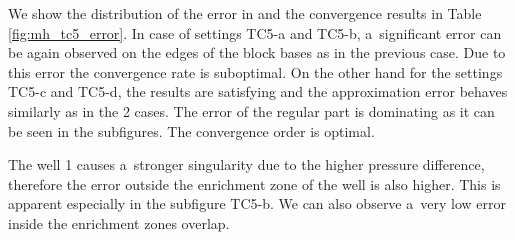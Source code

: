 We show the distribution of the error in  and the convergence results in Table \ref{fig:mh_tc5_error}.
In case of settings TC5-a and TC5-b, a~significant error can be again observed on the edges of the block bases as in the previous case.
Due to this error the convergence rate is suboptimal.
On the other hand for the settings TC5-c and TC5-d, the results are satisfying and the approximation error behaves similarly
as in the 2 cases. The error of the regular part is dominating as it can be seen in the subfigures. The convergence order 
is optimal.

The well 1 causes a~stronger singularity due to the higher pressure difference,
therefore the error outside the enrichment zone of the well is also higher.
This is apparent especially in the subfigure TC5-b. We can also observe a~very low error
inside the enrichment zones overlap.

